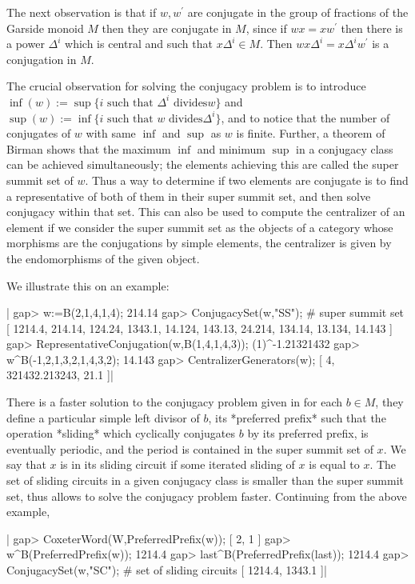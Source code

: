 The  next observation is that if $w,w^\prime$ are conjugate in the group of
fractions  of the Garside monoid $M$ then  they are conjugate in $M$, since
if  $wx=xw^\prime$ then  there is  a power  $\Delta^i$ which is central and
such  that  $x\Delta^i\in  M$.  Then  $wx\Delta^i=x\Delta^i  w^\prime$ is a
conjugation in $M$.

The  crucial observation for solving the  conjugacy problem is to introduce
$\inf(w):=\sup\{i\text{   such  that  }\Delta^i\text{   divides}  w\}$  and
$\sup(w):=\inf\{i\text{  such  that  }w\text{  divides} \Delta^i\}$, and to
notice  that the number of conjugates of $w$ with same $\inf$ and $\sup$ as
$w$  is finite. Further, a theorem of  Birman shows that the maximum $\inf$
and minimum $\sup$ in a conjugacy class can be achieved simultaneously; the
elements  achieving this are called the super summit set of $w$. Thus a way
to  determine if two elements are conjugate  is to find a representative of
both  of them in  their super summit  set, and then  solve conjugacy within
that  set. This can also be used to compute the centralizer of an element\:
if  we consider  the super  summit set  as the  objects of a category whose
morphisms are the conjugations by simple elements, the centralizer is given
by the endomorphisms of the given object.

We illustrate this on an example:

|    gap> w:=B(2,1,4,1,4);
    214.14
    gap> ConjugacySet(w,"SS"); # super summit set
    [ 1214.4, 214.14, 124.24, 1343.1, 14.124, 143.13, 24.214, 134.14,
      13.134, 14.143 ]
    gap> RepresentativeConjugation(w,B(1,4,1,4,3));
    (1)^-1.21321432
    gap> w^B(-1,2,1,3,2,1,4,3,2);
    14.143
    gap> CentralizerGenerators(w);
    [ 4, 321432.213243, 21.1 ]|

There   is  a   faster  solution   to  the   conjugacy  problem   given  in
\cite{gebgon10}\:  for each $b\in M$, they  define a particular simple left
divisor  of $b$, its  *preferred prefix* such  that the operation *sliding*
which  cyclically  conjugates  $b$  by  its preferred prefix, is eventually
periodic,  and the period is  contained in the super  summit set of $x$. We
say  that $x$ is in its sliding circuit  if some iterated sliding of $x$ is
equal  to $x$. The  set of sliding  circuits in a  given conjugacy class is
smaller  than  the  super  summit  set,  thus allows to solve the conjugacy
problem faster. Continuing from the above example,

|    gap> CoxeterWord(W,PreferredPrefix(w));
    [ 2, 1 ]
    gap> w^B(PreferredPrefix(w));
    1214.4
    gap> last^B(PreferredPrefix(last));
    1214.4
    gap> ConjugacySet(w,"SC"); # set of sliding circuits
    [ 1214.4, 1343.1 ]|

